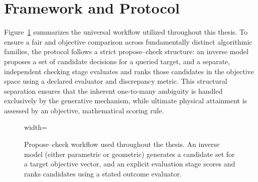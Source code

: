 

\section{Framework and Protocol}\label{sec:framework}

Figure~\ref{fig:framework} summarizes the universal workflow utilized throughout this thesis. To ensure a fair and objective comparison across fundamentally distinct algorithmic families, the protocol follows a strict propose--check structure: an inverse model proposes a set of candidate decisions for a queried target, and a separate, independent checking stage evaluates and ranks those candidates in the objective space using a declared evaluator and discrepancy metric.  This structural separation ensures that the inherent one-to-many ambiguity is handled exclusively by the generative mechanism, while ultimate physical attainment is assessed by an objective, mathematical scoring rule.

\begin{figure}[!htbp]
  \centering
  \begin{adjustbox}{width=\linewidth}
      
  \end{adjustbox}
  \caption[Propose--Check Workflow Framework]{Propose--check workflow used throughout the thesis. An inverse model (either parametric or geometric) generates a candidate set for a target objective vector, and an explicit evaluation stage scores and ranks candidates using a stated outcome evaluator.}
  \label{fig:framework}
\end{figure}

